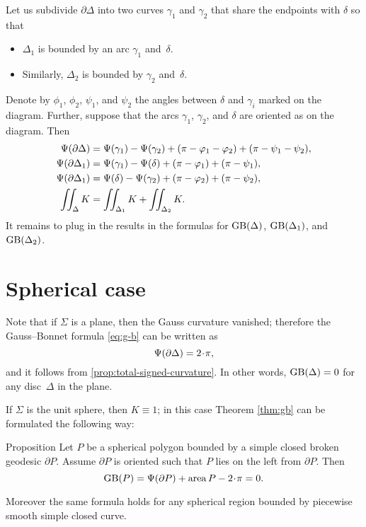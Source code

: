 Let us subdivide $\partial \Delta$ into two curves $\gamma_1$ and $\gamma_2$ that share the endpoints with $\delta$ so that
\begin{itemize}
\item $\Delta_1$ is bounded by an arc $\gamma_1$  and~$\delta$.
\item Similarly, $\Delta_2$ is bounded by $\gamma_2$ and~$\delta$.
\end{itemize}

Denote by $\phi_1$, $\phi_2$, $\psi_1$, and $\psi_2$ the angles between $\delta$ and $\gamma_i$ marked on the diagram.
Further, suppose that the arcs $\gamma_1$, $\gamma_2$, and $\delta$ are oriented as on the diagram. 
Then
\begin{align*}
\Psi({\partial \Delta})&= \Psi({\gamma_1})-\Psi({\gamma_2})+(\pi-\varphi_1-\varphi_2)+(\pi-\psi_1-\psi_2),
\\
\Psi({\partial \Delta_1})&= \Psi({\gamma_1})-\Psi({\delta})+(\pi-\varphi_1)+(\pi-\psi_1),
\\
\Psi({\partial \Delta_1})&= \Psi({\delta})-\Psi({\gamma_2})+(\pi-\varphi_2)+(\pi-\psi_2),
\\
\iint_\Delta K&=\iint_{\Delta_1} K+\iint_{\Delta_2} K.
\end{align*}
It remains to plug in the results in the formulas for $\mathop{\rm GB}\nolimits(\Delta)$, $\mathop{\rm GB}\nolimits(\Delta_1)$, and $\mathop{\rm GB}\nolimits(\Delta_2)$.
\qeds

\section{Spherical case}

Note that if $\Sigma$ is a plane, then the Gauss curvature vanished;
therefore the Gauss--Bonnet formula \ref{eq:g-b} can be written as 
\[\tgc{\partial\Delta}=2\cdot \pi,\]
and it follows from \ref{prop:total-signed-curvature}.
In other words, $\mathop{\rm GB}\nolimits(\Delta)=0$ for any disc~$\Delta$ in the plane.

If $\Sigma$ is the unit sphere, then $K\equiv1$;
in this case Theorem \ref{thm:gb} can be formulated the following way:

\begin{thm}{Proposition}\label{prop:area-of-spher-polygon}
Let $P$ be a spherical polygon bounded by a simple closed broken geodesic $\partial P$.
Assume $\partial P$ is oriented such that $P$ lies on the left from $\partial P$.
Then 
\[\GB(P)=\tgc{\partial P}+\area P-2\cdot \pi=0.\]

Moreover the same formula holds for any spherical region bounded by piecewise smooth simple closed curve.
\end{thm}

